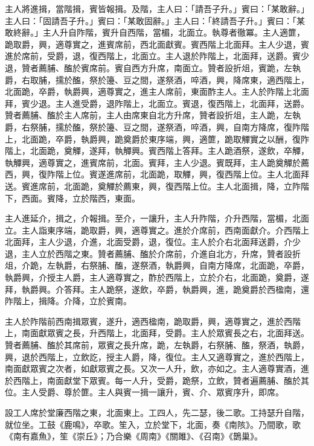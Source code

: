 \begin{pinyinscope}
 主人將進揖，當階揖，賓皆報揖。及階，主人曰：「請吾子升。」賓曰：「某敢辭。」主人曰：「固請吾子升。」賓曰：「某敢固辭。」主人曰：「終請吾子升。」賓曰：「某敢終辭。」主人升自阼階，賓升自西階，當楣，北面立。執尊者徹冪。主人適篚，跪取爵，興，適尊實之，進賓席前，西北面獻賓。賓西階上北面拜。主人少退，賓進於席前，受爵，退，復西階上，北面立。主人退於阼階上，北面拜，送爵。賓少退，贊者薦脯、醢於賓席前。賓自西方升席，南面立。贊者設折俎，賓跪，左執爵，右取脯，擩於醢，祭於籩、豆之間，遂祭酒，啐酒，興，降席東，適西階上，北面跪，卒爵，執爵興，適尊實之，進主人席前，東面酢主人。主人於阼階上北面拜，賓少退。主人進受爵，退阼階上，北面立。賓退，復西階上，北面拜，送爵。贊者薦脯、醢於主人席前，主人由席東自北方升席，贊者設折俎，主人跪，左執爵，右祭脯，擩於醢，祭於籩、豆之間，遂祭酒，啐酒，興，自南方降席，復阼階上，北面跪，卒爵，執爵興，跪奠爵於東序端，興，適篚，跪取觶實之以酬，復阼階上，北面跪，奠觶，遂拜，執觶興。賓西階上答拜。主人跪酒祭，遂飲，卒觶，執觶興，適尊實之，進賓席前，北面。賓拜，主人少退。賓既拜，主人跪奠觶於薦西，興，復阼階上位。賓遂進席前，北面跪，取觶，興，復西階上位。主人北面拜送。賓進席前，北面跪，奠觶於薦東，興，復西階上位。主人北面揖，降，立阼階下，西面。賓降，立於階西，東面。



 主人進延介，揖之，介報揖。至介，一讓升，主人升阼階，介升西階，當楣，北面立。主人詣東序端，跪取爵，興，適尊實之。進於介席前，西南面獻介。介西階上北面拜，主人少退，介進，北面受爵，退，復位。主人於介右北面拜送爵，介少退，主人立於西階之東。贊者薦脯、醢於介席前，介進自北方，升席，贊者設折俎，介跪，左執爵，右祭脯、醢，遂祭酒，執爵興，自南方降席，北面跪，卒爵，執爵興，介授主人爵，主人適尊實之，酢於西階上，立於介右，北面跪，奠爵，遂拜，執爵興。介答拜。主人跪祭，遂飲，卒爵，執爵興，進，跪奠爵於西楹南，還阼階上，揖降。介降，立於賓南。



 主人於阼階前西南揖眾賓，遂升，適西楹南，跪取爵，興，適尊實之，進於西階上，南面獻眾賓之長，升西階上，北面拜，受爵。主人於眾賓長之右，北面拜送。贊者薦脯、醢於其席前，眾賓之長升席，跪，左執爵，右祭脯、醢，祭酒，執爵，興，退於西階上，立飲訖，授主人爵，降，復位。主人又適尊實之，進於西階上，南面獻眾賓之次者，如獻眾賓之長。又次一人升，飲，亦如之。主人適尊實酒，進於西階上，南面獻堂下眾賓。每一人升，受爵，跪祭，立飲，贊者遍薦脯、醢於其位。主人受爵、尊於篚。主人與賓一揖一讓升，賓、介、眾賓序升，即席。



 設工人席於堂廉西階之東，北面東上。工四人，先二瑟，後二歌。工持瑟升自階，就位坐。工鼓《鹿鳴》，卒歌。笙入，立於堂下，北面，奏《南陔》。乃間歌，歌《南有嘉魚》，笙《崇丘》；乃合樂《周南》《關雎》、《召南》《鵲巢》。




\end{pinyinscope}
